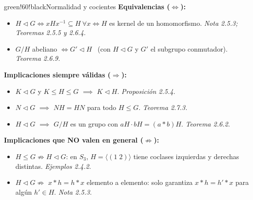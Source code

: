 \documentclass[11pt,twoside]{article}
\begin{document}
\begin{equivbox}{green!60!black}{Normalidad y cocientes}
\textbf{Equivalencias ($\Leftrightarrow$):}
\begin{itemize}[leftmargin=1.8em]
\item $H \triangleleft G \iff xHx^{-1} \subseteq H\ \forall x \iff H$ es kernel de un homomorfismo. \hfill\textit{Nota 2.5.3; Teoremas 2.5.5 y 2.6.4.}
\item $G/H$ abeliano $\iff G' \triangleleft H$ \ (con $H \triangleleft G$ y $G'$ el subgrupo conmutador). \hfill\textit{Teorema 2.6.9.}
\end{itemize}
\textbf{Implicaciones siempre válidas ($\Rightarrow$):}
\begin{itemize}[leftmargin=1.8em]
\item $K \triangleleft G$ y $K \leq H \leq G$ $\implies$ $K \triangleleft H$. \hfill\textit{Proposición 2.5.4.}
\item $N \triangleleft G$ $\implies$ $NH = HN$ para todo $H \leq G$. \hfill\textit{Teorema 2.7.3.}
\item $H \triangleleft G$ $\implies$ $G/H$ es un grupo con $aH \cdot bH = (a \ast b)H$. \hfill\textit{Teorema 2.6.2.}
\end{itemize}
\textbf{Implicaciones que NO valen en general ($\not\Rightarrow$):}
\begin{itemize}[leftmargin=1.8em]
\item $H \leq G \not\Rightarrow H \triangleleft G$: en $S_{3}$, $H = \langle (1\;2) \rangle$ tiene coclases izquierdas y derechas distintas. \hfill\textit{Ejemplos 2.4.2.}
\item $H \triangleleft G \not\Rightarrow$ $x \ast h = h \ast x$ elemento a elemento: solo garantiza $x \ast h = h' \ast x$ para algún $h' \in H$. \hfill\textit{Nota 2.5.3.}
\end{itemize}
\end{equivbox}
\end{document}
